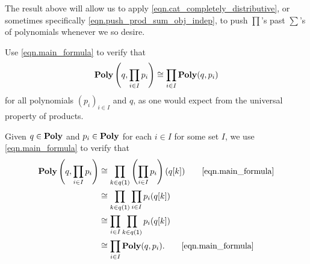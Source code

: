 \documentclass[Book-Poly]{subfiles}
\begin{document}
The result above will allow us to apply \eqref{eqn.cat_completely_distributive}, or sometimes specifically \eqref{eqn.push_prod_sum_obj_indep}, to push $\prod$'s past $\sum$'s of polynomials whenever we so desire.

\begin{exercise}%
    Use \eqref{eqn.main_formula}
    to verify that
    \[
    \mathbf{Poly}\left(q, \prod_{i \in I} p_i\right) \cong \prod_{i \in I} \mathbf{Poly}(q, p_i)
    \]
    for all polynomials $(p_i)_{i \in I}$ and $q$, as one would expect from the universal property of products.
    \qedhere
  \begin{solution}
    Given $q \in \mathbf{Poly}$ and $p_i \in \mathbf{Poly}$ for each $i \in I$ for some set $I$, we use \eqref{eqn.main_formula} to verify that
      \begin{align*}
        \poly\left(q, \prod_{i \in I} p_i\right) &\iso \prod_{k \in q(\1)} \left(\prod_{i \in I} p_i\right)(q[k])
        \tag*{\eqref{eqn.main_formula}} \\
        &\iso \prod_{k \in q(\1)} \prod_{i \in I} p_i(q[k]) \\
        &\iso \prod_{i \in I} \prod_{k \in q(\1)} p_i(q[k]) \\
        &\iso \prod_{i \in I} \poly(q, p_i).
        \tag*{\eqref{eqn.main_formula}}
      \end{align*}
  \end{solution}
\end{exercise}
\end{document}
